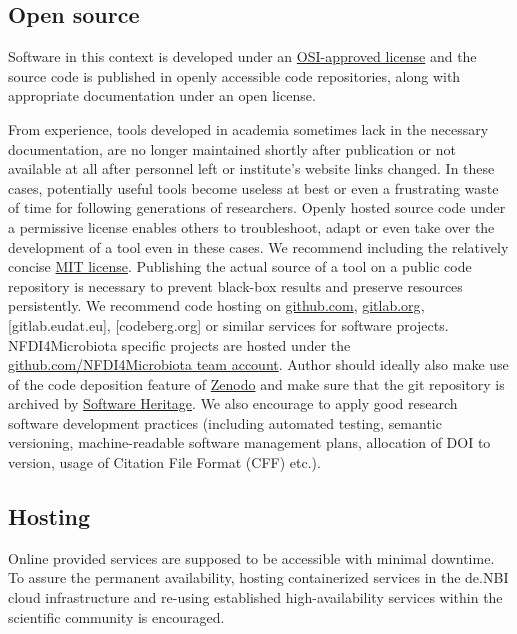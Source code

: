 \documentclass[
  paper=a4,
  ,captions=tableheading
]{scrartcl}
\renewenvironment{quote}{\begin{shaded*}\begin{em}}{\end{em}\end{shaded*}}
\renewenvironment{quote}{\begin{customblockquote}\list{}{\rightmargin=0em\leftmargin=0em}%
\item\relax\color{blockquote-text}\ignorespaces}{\unskip\unskip\endlist\end{customblockquote}}
\begin{document}
\hypertarget{open-source}{%
\subsection{Open source}\label{open-source}}

Software in this context is developed under an
\href{https://opensource.org/licenses/}{OSI-approved license} and the
source code is published in openly accessible code repositories, along
with appropriate documentation under an open license.

\begin{quote}
From experience, tools developed in academia sometimes lack in the
necessary documentation, are no longer maintained shortly after
publication or not available at all after personnel left or institute's
website links changed. In these cases, potentially useful tools become
useless at best or even a frustrating waste of time for following
generations of researchers. Openly hosted source code under a permissive
license enables others to troubleshoot, adapt or even take over the
development of a tool even in these cases. We recommend including the
relatively concise \href{https://opensource.org/license/mit/}{MIT
license}. Publishing the actual source of a tool on a public code
repository is necessary to prevent black-box results and preserve
resources persistently. We recommend code hosting on \url{github.com},
\url{gitlab.org}, {[}gitlab.eudat.eu{]}, {[}codeberg.org{]} or similar
services for software projects. NFDI4Microbiota specific projects are
hosted under the
\href{github.com/NFDI4Microbiota}{github.com/NFDI4Microbiota team
account}. Author should ideally also make use of the code deposition
feature of \href{zenodo.org}{Zenodo} and make sure that the git
repository is archived by \href{softwareheritage.org}{Software
Heritage}. We also encourage to apply good research software development
practices (including automated testing, semantic versioning,
machine-readable software management plans, allocation of DOI to
version, usage of Citation File Format (CFF) etc.).
\end{quote}

\hypertarget{hosting}{%
\subsection{Hosting}\label{hosting}}

Online provided services are supposed to be accessible with minimal
downtime. To assure the permanent availability, hosting containerized
services in the de.NBI cloud infrastructure and re-using established
high-availability services within the scientific community is
encouraged.
\end{document}
